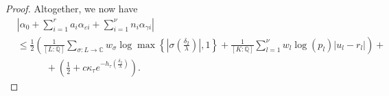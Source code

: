 \begin{proof}
Altogether, we now have
\begin{align*}
&\left|\alpha_0+\sum_{i = 1}^r a_i \alpha_{\varepsilon i} + \sum_{i = 1}^{\nu} n_i \alpha_{\gamma i}\right|\\
	& \leq \frac{1}{2}\left(\frac{1}{[L:\mathbb{Q}]}\sum_{\sigma :L \to \mathbb{C}} w_{\sigma}\log \max \left\{ \left|\sigma\left(\frac{\delta_2}{\lambda}\right)\right|, 1\right\} + \frac{1}{[K:\mathbb{Q}]}\sum_{l = 1}^{\nu}w_l \log(p_l)|u_l - r_l|\right) + \\
	& \quad \quad \quad + \left(\frac{1}{2} + c\kappa_{\tau}e^{-h_{\tau}\left(\frac{\delta_2}{\lambda}\right)}\right).
\end{align*} 

%
%

\end{proof}

